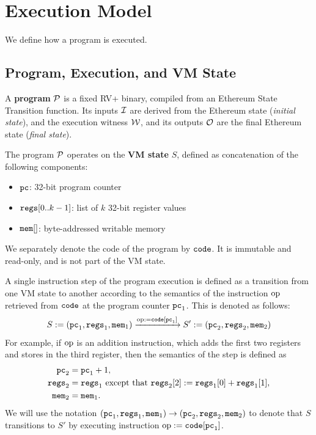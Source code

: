 \section{Execution Model}
We define how a program is executed.

\subsection{Program, Execution, and VM State}

A \textbf{program} $\mathcal{P}$ is a fixed RV+ binary, compiled from an Ethereum State Transition function.
Its inputs $\mathcal{I}$ are derived from the Ethereum state (\emph{initial state}), and
the execution witness $\mathcal{W}$,
and its outputs $\mathcal{O}$ are the final Ethereum state (\emph{final state}).

The program $\mathcal{P}$ operates on the \textbf{VM state} $S$, defined as concatenation of the following components:
\begin{itemize}
\item $\mathtt{pc}$: 32-bit program counter
\item $\mathtt{regs}[0..k-1]$: list of $k$ 32-bit register values
\item $\mathtt{mem}[]$: byte-addressed writable memory
\end{itemize}
We separately denote the code of the program by $\mathtt{code}$. It is immutable and read-only, and is not part of the VM state.

A single instruction step of the program execution is defined as a transition from
one VM state to another according to the semantics of the instruction $\mathrm{op}$ retrieved from
$\mathtt{code}$ at the program counter $\mathtt{pc}_1$. This is denoted as follows:
\begin{equation}\label{eq:op}
S:=(\mathtt{pc}_1,\mathtt{regs}_1,\mathtt{mem}_1)\xrightarrow{\mathrm{op}:=\mathtt{code}[\mathtt{pc}_1]} S':=(\mathtt{pc}_2,\mathtt{regs}_2,\mathtt{mem}_2)
\end{equation}
For example, if $\mathrm{op}$ is an addition instruction, which adds the first two registers and stores in the third register, then the semantics of the step is defined as
\begin{align}
\mathtt{pc}_2&=\mathtt{pc}_1+1,\\
\mathtt{regs}_2&=\mathtt{regs}_1\text{ except that } \mathtt{regs}_2[2]:=\mathtt{regs}_1[0]+\mathtt{regs}_1[1],\\
\mathtt{mem}_2&=\mathtt{mem}_1.
\end{align}
We will use the notation $(\mathtt{pc}_1,\mathtt{regs}_1,\mathtt{mem}_1)\rightarrow  (\mathtt{pc}_2,\mathtt{regs}_2,\mathtt{mem}_2)$ to denote that $S$ transitions to $S'$ by executing instruction
 $\mathrm{op}:=\mathtt{code}[\mathtt{pc}_1]$.


